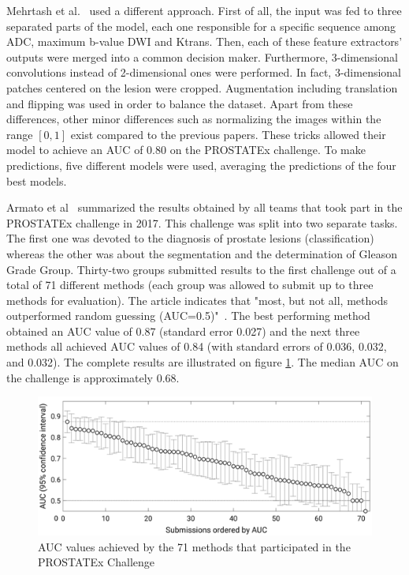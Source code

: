 Mehrtash et al.~\cite{01} used a different approach. First of all, the input was fed to three separated parts of the model, each one responsible for a specific sequence among ADC, maximum b-value DWI and Ktrans. Then, each of these feature extractors' outputs were merged into a common decision maker. Furthermore, 3-dimensional convolutions instead of 2-dimensional ones were performed. In fact, 3-dimensional patches centered on the lesion were cropped. Augmentation including translation and flipping was used in order to balance the dataset. Apart from these differences, other minor differences such as normalizing the images within the range $[0,1]$ exist compared to the previous papers. These tricks allowed their model to achieve an AUC of $0.80$ on the PROSTATEx challenge. To make predictions, five different models were used, averaging the predictions of the four best models. 

Armato et al~\cite{42} summarized the results obtained by all teams that took part in the PROSTATEx challenge in 2017. This challenge was split into two separate tasks. The first one was devoted to the diagnosis of prostate lesions (classification) whereas the other was about the segmentation and the determination of Gleason Grade Group. Thirty-two groups submitted results to the first challenge out of a total of 71 different methods (each group was allowed to submit up to three methods for evaluation). The article indicates that "most, but not all, methods outperformed random guessing (AUC=0.5)"~\cite{41}. The best performing method obtained an AUC value of 0.87 (standard error 0.027) and the next three methods all achieved AUC values of 0.84 (with standard errors of 0.036, 0.032, and 0.032). The complete results are illustrated on figure \ref{fig:challenge_all_results}. The median AUC on the challenge is approximately $0.68$.
\begin{figure}[!h]
\centering
\includegraphics[width=1\textwidth, keepaspectratio=true]{./figures/challenge_all_results.png}
\caption{AUC values achieved by the 71 methods that participated in the PROSTATEx Challenge~\cite{42}}
\label{fig:challenge_all_results}
\end{figure}


